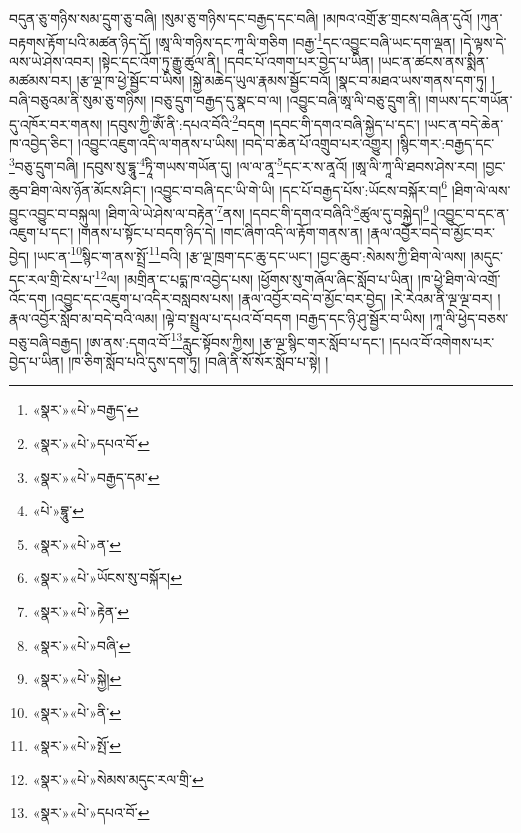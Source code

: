 བདུན་ཅུ་གཉིས་སམ་དྲུག་ཅུ་བཞི། །སུམ་ཅུ་གཉིས་དང་བརྒྱད་དང་བཞི། །མཁའ་འགྲོ་རྩ་གྲངས་བཞིན་དུའོ། །ཀུན་བརྟགས་རྟོག་པའི་མཚན་ཉིད་དོ། །ཨཱ་ལི་གཉིས་དང་ཀཱ་ལི་གཅིག །བརྒྱ་\footnote{«སྣར་»«པེ་»བརྒྱད་}དང་འབྱུང་བཞི་ཡང་དག་ལྡན། །དེ་ལྟས་དེ་ལས་ཡེ་ཤེས་འབར། །སྟེང་དང་འོག་ཏུ་རྒྱུ་ཚུལ་ནི། །དབང་པོ་འགག་པར་བྱེད་པ་ཡིན། །ཡང་ན་ཚངས་ནས་སྨིན་མཚམས་བར། །རྩ་ལྔ་ཁ་ཕྱེ་སྦྱོང་བ་ཡིས། །སྐྱེ་མཆེད་ཡུལ་རྣམས་སྦྱོང་བའོ། །སྣང་བ་མཐའ་ཡས་གནས་དག་ཏུ། །བཞི་བཅུའམ་ནི་སུམ་ཅུ་གཉིས། །བཅུ་དྲུག་བརྒྱད་དུ་སྣང་བ་ལ། །འབྱུང་བཞི་ཨཱ་ལི་བཅུ་དྲུག་ནི། །གཡས་དང་གཡོན་དུ་འཁོར་བར་གནས། །དབུས་ཀྱི་ཨོཾ་ནི་:དཔའ་བོའི་\footnote{«སྣར་»«པེ་»དཔའ་བོ་}བདག །དབང་གི་དགའ་བཞི་སྐྱེད་པ་དང་། །ཡང་ན་བདེ་ཆེན་ཁ་འབྱེད་ཅིང་། །འབྱུང་འཇུག་འདི་ལ་གནས་པ་ཡིས། །བདེ་བ་ཆེན་པོ་འགྲུབ་པར་འགྱུར། །སྙིང་གར་:བརྒྱད་དང་\footnote{«སྣར་»«པེ་»བརྒྱད་དམ་}བཅུ་དྲུག་བཞི། །དབུས་སུ་དྷཱུ་\footnote{«པེ་»བྷཱུ་}ཏཱི་གཡས་གཡོན་དུ། །ལ་ལ་ནཱ་\footnote{«སྣར་»«པེ་»ན་}དང་ར་ས་ནཱའོ། །ཨཱ་ལི་ཀཱ་ལི་ཐབས་ཤེས་རབ། །བྱང་ཆུབ་ཐིག་ལེས་ཉོན་མོངས་ཤིང་། །འབྱུང་བ་བཞི་དང་ཡི་གེ་ཡི། །དང་པོ་བརྒྱད་པོས་:ཡོངས་བསྐོར་བ།\footnote{«སྣར་»«པེ་»ཡོངས་སུ་བསྐོར།} །ཐིག་ལེ་ལས་བྱུང་འབྱུང་བ་བསྐུལ། །ཐིག་ལེ་ཡེ་ཤེས་ལ་བརྟེན་\footnote{«སྣར་»«པེ་»རྟེན་}ནས། །དབང་གི་དགའ་བཞིའི་\footnote{«སྣར་»«པེ་»བཞི་}ཚུལ་དུ་བསྐྱེད།\footnote{«སྣར་»«པེ་»སྐྱེ།} །འབྱུང་བ་དང་ན་འཇུག་པ་དང་། །གནས་པ་སྟོང་པ་བདག་ཉིད་དེ། །གང་ཞིག་འདི་ལ་རྟོག་གནས་ན། །རྣལ་འབྱོར་བདེ་བ་མྱོང་བར་བྱེད། །ཡང་ན་\footnote{«སྣར་»«པེ་»ནི་}སྙིང་ག་ནས་སྤྲོ་\footnote{«སྣར་»«པེ་»སྤོ་}བའི། །རྩ་ལྔ་ཁྲག་དང་ཆུ་དང་ཡང་། །བྱང་ཆུབ་:སེམས་ཀྱི་ཐིག་ལེ་ལས། །མདུང་དང་རལ་གྲི་ངེས་པ་\footnote{«སྣར་»«པེ་»སེམས་མདུང་རལ་གྲི་}ལ། །མགྲིན་ང་པདྨ་ཁ་འབྱེད་པས། །ཕྱོགས་སུ་གཞོལ་ཞིང་སློབ་པ་ཡིན། །ཁ་ཕྱེ་ཐིག་ལེ་འགྲོ་འོང་དག །འབྱུང་དང་འཇུག་པ་འདིར་བསླབས་པས། །རྣལ་འབྱོར་བདེ་བ་མྱོང་བར་བྱེད། །རེ་རེའམ་ནི་ལྔ་ལྔ་བར། །རྣལ་འབྱོར་སློབ་མ་བདེ་བའི་ལམ། །ལྟེ་བ་སྤྲུལ་པ་དཔའ་བོ་བདག །བརྒྱད་དང་ཉི་ཤུ་སྦྱོར་བ་ཡིས། །ཀཱ་ལི་ཕྱེད་བཅས་བཅུ་བཞི་བརྒྱད། །ཨ་ནས་:དགའ་བོ་\footnote{«སྣར་»«པེ་»དཔའ་བོ་}རླུང་སྟོབས་ཀྱིས། །རྩ་ལྔ་སྙིང་གར་སློབ་པ་དང་། །དཔའ་བོ་འགེགས་པར་བྱེད་པ་ཡིན། །ཁ་ཅིག་སློབ་པའི་དུས་དག་ཏུ། །བཞི་ནི་སོ་སོར་སློབ་པ་སྟེ། །
